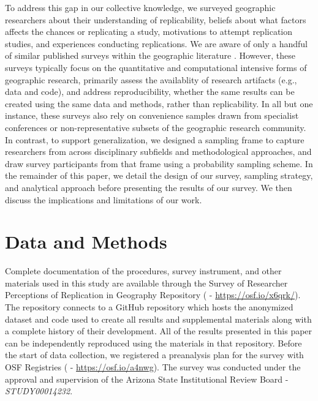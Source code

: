 \documentclass[]{interact}
\theoremstyle{plain}%
\theoremstyle{definition}
\theoremstyle{remark}
\begin{document}
To address this gap in our collective knowledge, we surveyed geographic researchers about their understanding of replicability, beliefs about what factors affects the chances or replicating a study, motivations to attempt replication studies, and experiences conducting replications.
We are aware of only a handful of similar published surveys within the geographic literature \citep{balz2020reproducibility, konkol2019, ostermann2017, kedron2023survey}.
However, these surveys typically focus on the quantitative and computational intensive forms of geographic research, primarily assess the availablity of research artifacts (e.g., data and code), and address reproducibility, whether the same results can be created using the same data and methods, rather than replicability. 
In all but one instance, these surveys also rely on convenience samples drawn from specialist conferences or non-representative subsets of the geographic research community. 
In contrast, to support generalization, we designed a sampling frame to capture researchers from across disciplinary subfields and methodological approaches, and draw survey participants from that frame using a probability sampling scheme.
In the remainder of this paper, we detail the design of our survey, sampling strategy, and analytical approach before presenting the results of our survey. 
We then discuss the implications and limitations of our work. 


\section*{Data and Methods}
Complete documentation of the procedures, survey instrument, and other materials used in this study are available through the Survey of Researcher Perceptions of Replication in Geography Repository (\citet{Kedron_Holler_Bardin_Hilgendorf_2022} - \url{https://osf.io/x6qrk/}).
The repository connects to a GitHub repository which hosts the anonymized dataset and code used to create all results and supplemental materials along with a complete history of their development. 
All of the results presented in this paper can be independently reproduced using the materials in that repository.
Before the start of data collection, we registered a preanalysis plan for the survey with OSF Registries (\citet{Kedron_RPl_Survey_PAP} - \url{https://osf.io/a4nwg}). 
The survey was conducted under the approval and supervision of the Arizona State Institutional Review Board - \textit{STUDY00014232}.
\end{document}
